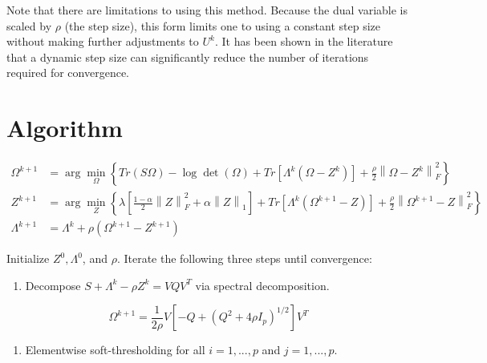 \documentclass[12pt,]{book}
\providecommand{\tightlist}{%
  \setlength{\itemsep}{0pt}\setlength{\parskip}{0pt}}
\theoremstyle{definition}
\theoremstyle{definition}
\theoremstyle{definition}
\theoremstyle{remark}
\begin{document}
Note that there are limitations to using this method. Because the dual
variable is scaled by \(\rho\) (the step size), this form limits one to
using a constant step size without making further adjustments to
\(U^{k}\). It has been shown in the literature that a dynamic step size
can significantly reduce the number of iterations required for
convergence.

\vspace{1cm}

\hypertarget{algorithm}{%
\section{Algorithm}\label{algorithm}}

\begin{align*}
  \Omega^{k + 1} &= \arg\min_{\Omega}\left\{ Tr\left(S\Omega\right) - \log\det\left(\Omega\right) + Tr\left[\Lambda^{k}\left(\Omega - Z^{k}\right)\right] + \frac{\rho}{2}\left\| \Omega - Z^{k} \right\|_{F}^{2} \right\} \\
  Z^{k + 1} &= \arg\min_{Z}\left\{ \lambda\left[ \frac{1 - \alpha}{2}\left\| Z \right\|_{F}^{2} + \alpha\left\| Z \right\|_{1} \right] + Tr\left[\Lambda^{k}\left(\Omega^{k + 1} - Z\right)\right] + \frac{\rho}{2}\left\| \Omega^{k + 1} - Z \right\|_{F}^{2} \right\} \\
  \Lambda^{k + 1} &= \Lambda^{k} + \rho\left( \Omega^{k + 1} - Z^{k + 1} \right)
\end{align*}

\vspace{1cm}

Initialize \(Z^{0}, \Lambda^{0}\), and \(\rho\). Iterate the following
three steps until convergence:

\begin{enumerate}
\def\labelenumi{\arabic{enumi}.}
\tightlist
\item
  Decompose \(S + \Lambda^{k} - \rho Z^{k} = VQV^{T}\) via spectral
  decomposition.
\end{enumerate}

\[ \Omega^{k + 1} = \frac{1}{2\rho}V\left[ -Q + \left( Q^{2} + 4\rho I_{p} \right)^{1/2} \right]V^{T} \]

\begin{enumerate}
\def\labelenumi{\arabic{enumi}.}
\setcounter{enumi}{1}
\tightlist
\item
  Elementwise soft-thresholding for all \(i = 1,..., p\) and
  \(j = 1,..., p\).
\end{enumerate}
\end{document}
